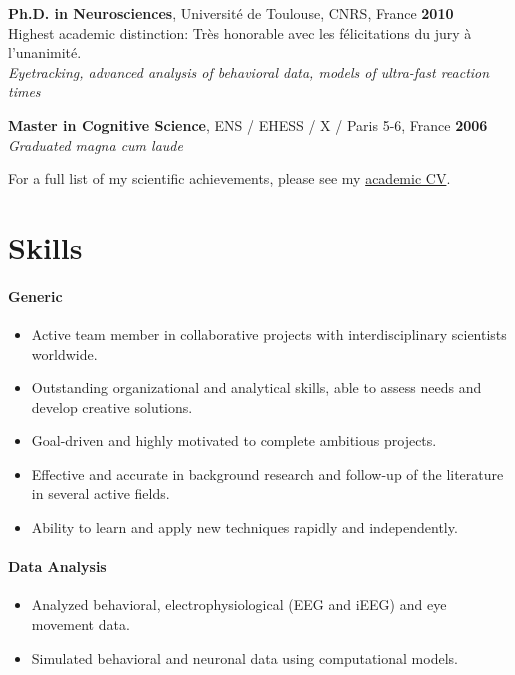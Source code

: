 \documentclass[margin,line]{resume}
\begin{document}
\begin{resume}
	\vspace{-1.5mm}	
         \textbf{Ph.D. in Neurosciences}, Université de Toulouse, CNRS, France \hfill \textbf{2010}\\
	Highest academic distinction: Très honorable avec les félicitations du jury à l'unanimité.\\
	\textsl{Eyetracking, advanced analysis of behavioral data, models of ultra-fast reaction times}
	
	\vspace{-1.5mm}
	\textbf{Master in Cognitive Science}, ENS / EHESS / X / Paris 5-6, France  \hfill \textbf{2006}\\
	\textsl{Graduated magna cum laude}
	
	\vspace{-1.5mm}
	For a full list of my scientific achievements, please see my \href{http://scrouzet.github.io/cv/CVSebastienCrouzet.pdf}{academic CV}.



    \vspace{3mm}
    \section{\mysidestyle Skills}
    \vspace{-0.5mm}

	\paragraph{Generic}
	\begin{itemize} \itemsep1pt \parskip0pt  \leftmargin=0em \itemindent=-1.5em
  		\item Active team member in collaborative projects with interdisciplinary scientists worldwide.
  		\item Outstanding organizational and analytical skills, able to assess needs and develop creative solutions. 
  		\item Goal-driven and highly motivated to complete ambitious projects.
  		\item Effective and accurate in background research and follow-up of the literature in several active fields.
  		\item Ability to learn and apply new techniques rapidly and independently.
	\end{itemize}

	\paragraph{Data Analysis}
	\begin{itemize} \itemsep1pt \parskip0pt  \leftmargin=0em \itemindent=-1.5em
  	\item Analyzed behavioral, electrophysiological (EEG and iEEG) and eye movement data.
	\item Simulated behavioral and neuronal data using computational models.
	\end{itemize}
		

\end{resume}
\end{document}
